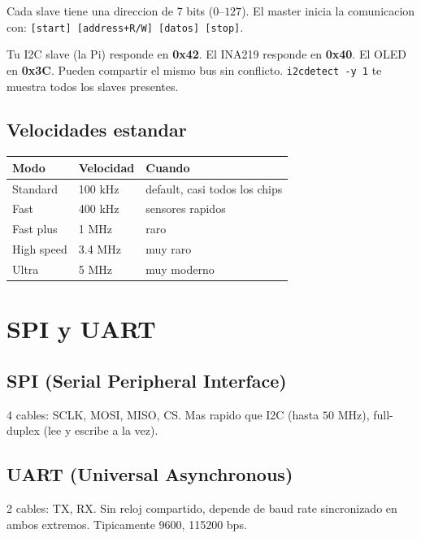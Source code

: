 \documentclass[11pt,a4paper,oneside,openright]{book}
\begin{document}
Cada slave tiene una direccion de 7 bits ($0$--$127$). El master inicia
la comunicacion con: \texttt{[start] [address+R/W] [datos] [stop]}.

\begin{payload}
Tu I2C slave (la Pi) responde en \textbf{0x42}. El INA219 responde en
\textbf{0x40}. El OLED en \textbf{0x3C}. Pueden compartir el mismo bus
sin conflicto. \texttt{i2cdetect -y 1} te muestra todos los slaves
presentes.
\end{payload}

\section{Velocidades estandar}

\begin{center}
\begin{tabular}{lll}
\toprule
\textbf{Modo} & \textbf{Velocidad} & \textbf{Cuando} \\
\midrule
Standard       & 100 kHz          & default, casi todos los chips \\
Fast           & 400 kHz          & sensores rapidos \\
Fast plus      & 1 MHz            & raro \\
High speed     & 3.4 MHz          & muy raro \\
Ultra          & 5 MHz            & muy moderno \\
\bottomrule
\end{tabular}
\end{center}

\chapter{SPI y UART}

\section{SPI (Serial Peripheral Interface)}

4 cables: SCLK, MOSI, MISO, CS. Mas rapido que I2C (hasta $50$ MHz),
full-duplex (lee y escribe a la vez).

\section{UART (Universal Asynchronous)}

2 cables: TX, RX. Sin reloj compartido, depende de baud rate sincronizado
en ambos extremos. Tipicamente 9600, 115200 bps.
\end{document}
